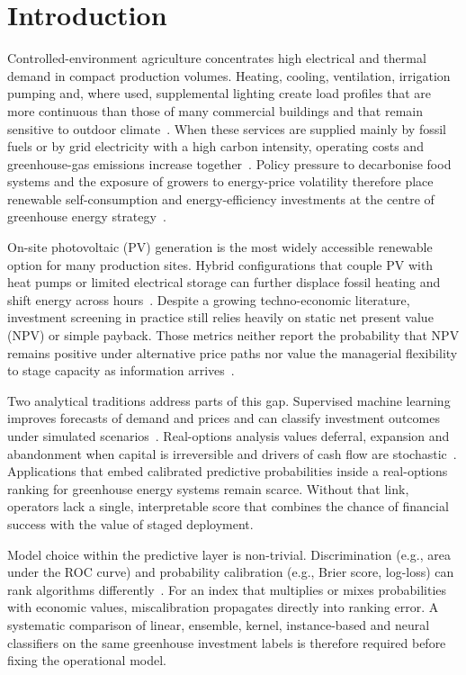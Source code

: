 \documentclass[agriengineering,article,submit,pdftex,moreauthors]{Definitions/mdpi}
\begin{document}
\section{Introduction}

Controlled-environment agriculture concentrates high electrical and thermal demand in compact production volumes. Heating, cooling, ventilation, irrigation pumping and, where used, supplemental lighting create load profiles that are more continuous than those of many commercial buildings and that remain sensitive to outdoor climate~\cite{ref-cigr,ref-vadiee,ref-fao,ref-vanbeveren}. When these services are supplied mainly by fossil fuels or by grid electricity with a high carbon intensity, operating costs and greenhouse-gas emissions increase together~\cite{ref-iea,ref-cigr}. Policy pressure to decarbonise food systems and the exposure of growers to energy-price volatility therefore place renewable self-consumption and energy-efficiency investments at the centre of greenhouse energy strategy~\cite{ref-iea,ref-yildirim,ref-allardyce}.

On-site photovoltaic (PV) generation is the most widely accessible renewable option for many production sites. Hybrid configurations that couple PV with heat pumps or limited electrical storage can further displace fossil heating and shift energy across hours~\cite{ref-heatpump,ref-pvgreen,ref-bambara}. Despite a growing techno-economic literature, investment screening in practice still relies heavily on static net present value (NPV) or simple payback. Those metrics neither report the probability that NPV remains positive under alternative price paths nor value the managerial flexibility to stage capacity as information arrives~\cite{ref-dixit,ref-trigeorgis,ref-schwartz}.

Two analytical traditions address parts of this gap. Supervised machine learning improves forecasts of demand and prices and can classify investment outcomes under simulated scenarios~\cite{ref-deb,ref-wang,ref-chen,ref-breiman,ref-bourdeau}. Real-options analysis values deferral, expansion and abandonment when capital is irreversible and drivers of cash flow are stochastic~\cite{ref-dixit,ref-amram,ref-mcdonald,ref-myers,ref-fernandez}. Applications that embed calibrated predictive probabilities inside a real-options ranking for greenhouse energy systems remain scarce. Without that link, operators lack a single, interpretable score that combines the chance of financial success with the value of staged deployment.

Model choice within the predictive layer is non-trivial. Discrimination (e.g., area under the ROC curve) and probability calibration (e.g., Brier score, log-loss) can rank algorithms differently~\cite{ref-degroot,ref-guo,ref-niculescu}. For an index that multiplies or mixes probabilities with economic values, miscalibration propagates directly into ranking error. A systematic comparison of linear, ensemble, kernel, instance-based and neural classifiers on the same greenhouse investment labels is therefore required before fixing the operational model.
\end{document}
